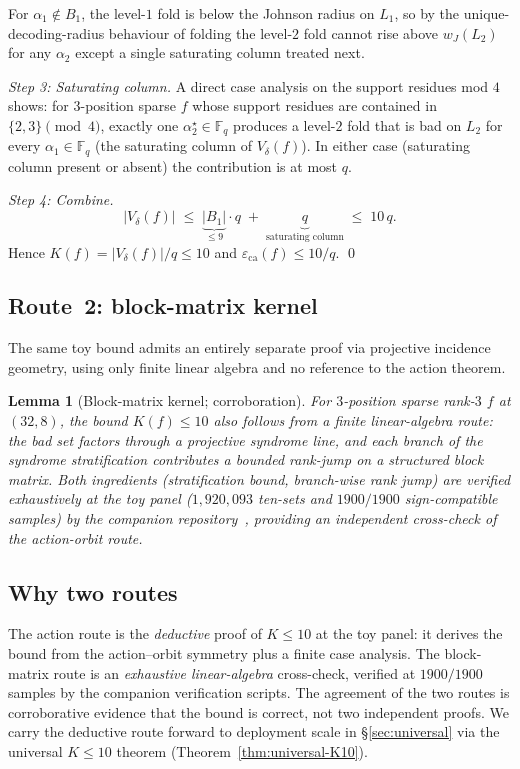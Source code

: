 \documentclass[11pt]{article}
\newtheorem{lemma}[theorem]{Lemma}
\theoremstyle{definition}
\theoremstyle{remark}
\newcommand{\FF}{\mathbb{F}}
\begin{document}
For $\alpha_1 \notin B_1$, the level-$1$ fold is below the Johnson radius
on $L_1$, so by the unique-decoding-radius behaviour of folding the
level-$2$ fold cannot rise above $w_J(L_2)$ for any $\alpha_2$ except a
single saturating column treated next.

\noindent\emph{Step 3: Saturating column.}
A direct case analysis on the support residues mod $4$ shows: for
$3$-position sparse $f$ whose support residues are contained in $\{2, 3\}
\pmod 4$, exactly one $\alpha_2^\star \in \FF_q$ produces a level-$2$ fold
that is bad on $L_2$ for every $\alpha_1 \in \FF_q$ (the saturating column
of $V_\delta(f)$). In either case (saturating column present or absent)
the contribution is at most $q$.

\noindent\emph{Step 4: Combine.}
\[
 |V_\delta(f)| \;\leq\; \underbrace{|B_1|}_{\leq 9} \cdot q \;+\;
 \underbrace{q}_{\text{saturating column}} \;\leq\; 10\, q.
\]
Hence $K(f) = |V_\delta(f)|/q \leq 10$ and
$\varepsilon_{\mathrm{ca}}(f) \leq 10/q$.
\qed

\subsection{Route~2: block-matrix kernel}

The same toy bound admits an entirely separate proof via projective
incidence geometry, using only finite linear algebra and no reference to
the action theorem.

\begin{lemma}[Block-matrix kernel; corroboration]
\label{lem:block-matrix}
For $3$-position sparse rank-$3$ $f$ at $(32, 8)$, the bound
$K(f) \leq 10$ also follows from a finite linear-algebra route: the
bad set factors through a projective syndrome line, and each branch
of the syndrome stratification contributes a bounded rank-jump on a
structured block matrix. Both ingredients (stratification bound,
branch-wise rank jump) are verified exhaustively at the toy panel
($1{,}920{,}093$ ten-sets and $1900/1900$ sign-compatible samples)
by the companion repository~\cite{CompanionRepo}, providing an
independent cross-check of the action-orbit route.
\end{lemma}

\subsection{Why two routes}

The action route is the \emph{deductive} proof of $K \leq 10$ at
the toy panel: it derives the bound from the action--orbit symmetry
plus a finite case analysis. The block-matrix route is an
\emph{exhaustive linear-algebra} cross-check, verified at
$1900/1900$ samples by the companion verification scripts. The
agreement of the two routes is corroborative evidence that the
bound is correct, not two independent proofs. We carry the
deductive route forward to deployment scale in \S\ref{sec:universal}
via the universal $K \leq 10$ theorem (Theorem~\ref{thm:universal-K10}).
\end{document}
